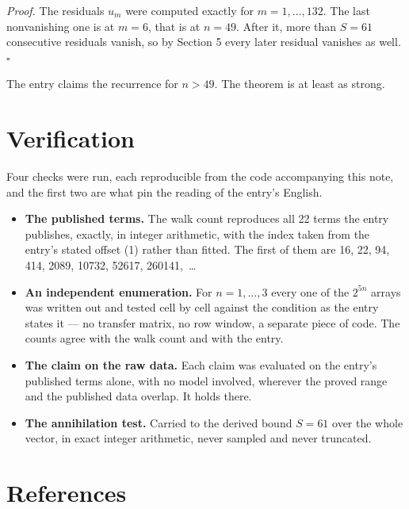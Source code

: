 \documentclass[11pt]{article}
\theoremstyle{definition}
\begin{document}
{\itshape Proof.} The residuals $u_m$ were computed exactly for $m = 1,\dots,132$. The last nonvanishing one is at $m = 6$, that is at $n = 49$. After it, more than $S = 61$ consecutive residuals vanish, so by Section 5 every later residual vanishes as well. $\square$

The entry claims the recurrence for $n > 49$. The theorem is at least as strong.

\section{Verification}

Four checks were run, each reproducible from the code accompanying this note, and the first two are what pin the reading of the entry's English.

\begin{itemize}

\item {\bfseries The published terms.} The walk count reproduces all 22 terms the entry publishes, exactly, in integer arithmetic, with the index taken from the entry's stated offset (1) rather than fitted. The first of them are 16, 22, 94, 414, 2089, 10732, 52617, 260141,~\dots

\item {\bfseries An independent enumeration.} For $n = 1,\dots,3$ every one of the $2^{5n}$ arrays was written out and tested cell by cell against the condition as the entry states it --- no transfer matrix, no row window, a separate piece of code. The counts agree with the walk count and with the entry.

\item {\bfseries The claim on the raw data.} Each claim was evaluated on the entry's published terms alone, with no model involved, wherever the proved range and the published data overlap. It holds there.

\item {\bfseries The annihilation test.} Carried to the derived bound $S = 61$ over the whole vector, in exact integer arithmetic, never sampled and never truncated.

\end{itemize}

\section{References}
\end{document}
